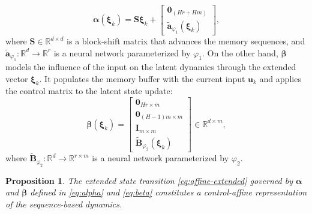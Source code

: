 \documentclass{article}
\newtheorem{proposition}{Proposition}
\begin{document}
\begin{equation}
\label{eq:alpha}
\boldsymbol{\alpha}(\boldsymbol{\xi}_k) = \mathbf{S} \boldsymbol{\xi}_k + \begin{bmatrix} \mathbf{0}_{(H r + H m)} \\ \widetilde{\mathbf{a}}_{\varphi_1}(\boldsymbol{\xi}_k) \end{bmatrix},
\end{equation}
where $\mathbf{S} \in \mathbb{R}^{d \times d}$ is a block-shift matrix that advances the memory sequences, and $\widetilde{\mathbf{a}}_{\varphi_1}:\mathbb{R}^d \rightarrow\mathbb{R}^r$ is a neural network parameterized by $\varphi_1$.
On the other hand, $\boldsymbol{\beta}$ models the influence of the input on the latent dynamics through the extended vector $\boldsymbol{\xi}_k$. It populates the memory buffer with the current input $\mathbf{u}_k$ and applies the control matrix to the latent state update:
\begin{equation}
\label{eq:beta}
\boldsymbol{\beta}(\boldsymbol{\xi}_k) =
\begin{bmatrix}
\mathbf{0}_{Hr \times m} \\
\mathbf{0}_{(H-1)m \times m} \\
\mathbf{I}_{m \times m} \\
\widetilde{\mathbf{B}}_{\varphi_2}(\boldsymbol{\xi}_k)
\end{bmatrix} \in \mathbb{R}^{d \times m},
\end{equation}
where $\widetilde{\mathbf{B}}_{\varphi_2}:\mathbb{R}^d \rightarrow \mathbb{R}^{r \times m}$ is a neural network parameterized by $\varphi_2$.

\begin{proposition}
The extended state transition \eqref{eq:affine-extended} governed by $\boldsymbol{\alpha}$ and $\boldsymbol{\beta}$ defined in \eqref{eq:alpha} and \eqref{eq:beta} constitutes a control-affine representation of the sequence-based dynamics.
\end{proposition}
\end{document}
